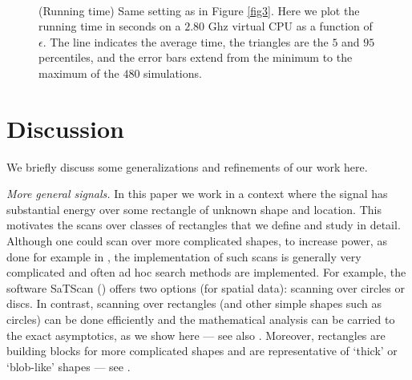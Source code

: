 \documentclass[twoside,11pt]{article}
\begin{document}
\begin{figure}[!htbp]
\centering
\mbox{
}
\caption{\small{(Running time) Same setting as in Figure \ref{fig3}.  Here we plot the running time in seconds on a $2.80$ Ghz virtual CPU as a function of $\epsilon$.  The line indicates the average time, the triangles are the $5$ and $95$ percentiles, and the error bars extend from the minimum to the maximum of the $480$ simulations.}}
\label{fig4}
\end{figure}

\section{Discussion}
\label{sec:discussion}


We briefly discuss some generalizations and refinements of our work here.

{\em More general signals.}
In this paper we work in a context where the signal has substantial energy over some rectangle of unknown shape and location. 
This motivates the scans over classes of rectangles that we define and study in detail.
Although one could scan over more complicated shapes, to increase power, as done for example in \citep{cluster,MGD,duczmal2006ess,kulldorff2006ess}, the implementation of such scans is generally very complicated and often ad hoc search methods are implemented.
For example, the software SaTScan (\citeauthor*{satscan}) offers two options (for spatial data): scanning over circles or discs.
In contrast, scanning over rectangles (and other simple shapes such as circles) can be done efficiently and the mathematical analysis can be carried to the exact asymptotics, as we show here --- see also \citep{MGD,MR2604703}.
Moreover, rectangles are building blocks for more complicated shapes and are representative of `thick' or `blob-like' shapes --- see \citep{cluster}.  
\end{document}
